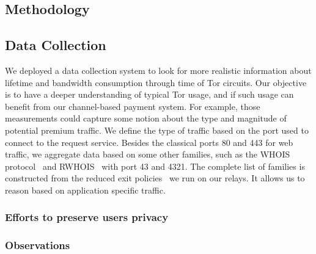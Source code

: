 \subsection{Methodology}
\subsection{Data Collection}
\label{subsec:datacollection}

We deployed a data collection system to look for more realistic information about lifetime and bandwidth consumption through time of Tor circuits. Our objective is to have a deeper understanding of typical Tor usage, and if such usage can benefit from our channel-based payment system. For example, those measurements could capture some notion about the type and magnitude of potential premium traffic. We define the type of traffic based on the port used to connect to the request service. Besides the classical ports 80 and 443 for web traffic, we aggregate data based on some other families, such as the WHOIS protocol~\cite{rfc3912} and RWHOIS~\cite{rfc2167} with port 43 and 4321. The complete list of families is constructed from the reduced exit policies~\cite{reducedexitpolicies} we run on our relays. It allows us to reason based on application specific traffic.

\subsubsection{Efforts to preserve users privacy}

\subsubsection{Observations}

